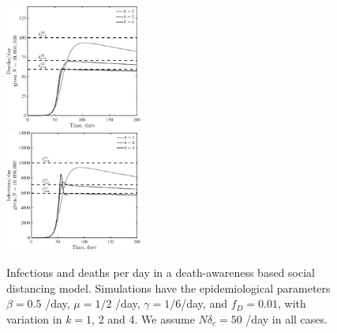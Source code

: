 \begin{figure}[t!]
\begin{center}
\includegraphics[width=0.4\textwidth]{scripts/figseir_baseplat_k2_D_noname.pdf}\\
\includegraphics[width=0.4\textwidth]{scripts/figseir_baseplat_k2_I_noname.pdf}
\caption{Infections and deaths per day in a death-awareness based
social distancing model.  Simulations have the
epidemiological parameters 
$\beta=0.5$ /day, $\mu=1/2$ /day, $\gamma=1/6$/day,
and $f_D=0.01$, with variation in $k=1$, 2 and 4. We assume
$N\delta_c = 50$ /day in all cases.
\label{fig.ID_day}}
\end{center}
\end{figure}

